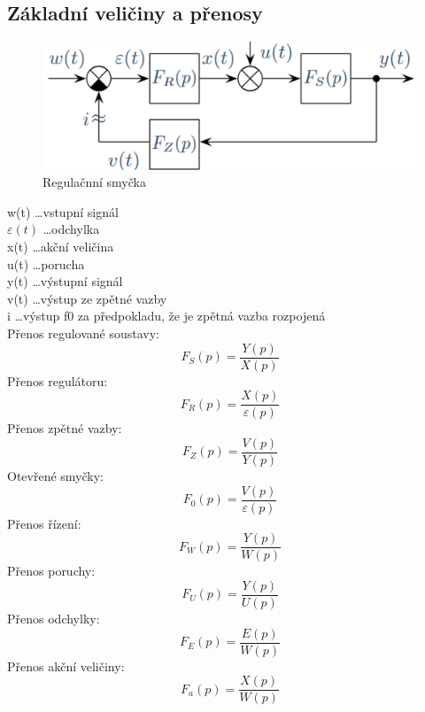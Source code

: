 \subsection*{Základní veličiny a přenosy}
\begin{figure}[H]
    \includegraphics[scale = 0.45]{images/reg.soustava2.png}
    \caption{Regulačnní smyčka}
\end{figure}
w(t) \dots vstupní signál \\
$\varepsilon(t)$ \dots odchylka \\
x(t) \dots akční veličina \\
u(t) \dots porucha \\
y(t) \dots výstupní signál\\
v(t) \dots výstup ze zpětné vazby\\
i    \dots výstup f0 za předpokladu, že je zpětná vazba rozpojená\\

\noindent
Přenos regulované soustavy:
\begin{equation}
    F_S(p) = \frac{Y(p)}{X(p)}
\end{equation}
Přenos regulátoru:
\begin{equation}
    F_R(p) = \frac{X(p)}{\varepsilon(p)}
\end{equation}
Přenos zpětné vazby:
\begin{equation}
    F_Z(p) = \frac{V(p)}{Y(p)}
\end{equation}
Otevřené smyčky:
\begin{equation}
    F_0(p) = \frac{V(p)}{\varepsilon(p)} %
\end{equation}
Přenos řízení:
\begin{equation}
    F_W(p) = \frac{Y(p)}{W(p)}
\end{equation}
Přenos poruchy:
\begin{equation}
    F_U(p) = \frac{Y(p)}{U(p)}
\end{equation}
Přenos odchylky:
\begin{equation}
    F_E(p)=\frac{E(p)}{W(p)}
\end{equation}
Přenos akční veličiny:
\begin{equation}
    F_a(p) = \frac{X(p)}{W(p)}
\end{equation}
